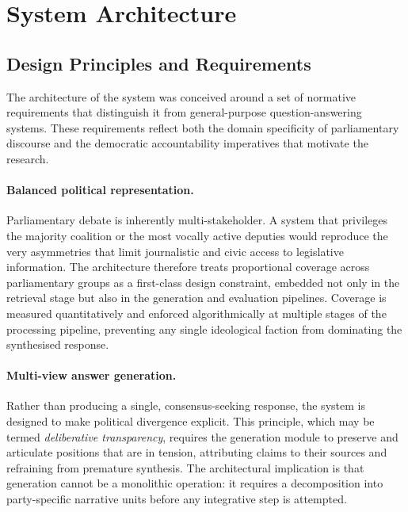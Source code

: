 
\section{System Architecture}

\subsection{Design Principles and Requirements}
\label{sec:design-principles}

The architecture of the system was conceived around a set of normative requirements that
distinguish it from general-purpose question-answering systems. These requirements reflect
both the domain specificity of parliamentary discourse and the democratic accountability
imperatives that motivate the research.

\paragraph{Balanced political representation.}
Parliamentary debate is inherently multi-stakeholder. A system that privileges the majority
coalition or the most vocally active deputies would reproduce the very asymmetries that
limit journalistic and civic access to legislative information. The architecture therefore
treats proportional coverage across parliamentary groups as a first-class design
constraint, embedded not only in the retrieval stage but also in the generation and
evaluation pipelines. Coverage is measured quantitatively and enforced algorithmically at
multiple stages of the processing pipeline, preventing any single ideological faction from
dominating the synthesised response.

\paragraph{Multi-view answer generation.}
Rather than producing a single, consensus-seeking response, the system is designed to make
political divergence explicit. This principle, which may be termed \textit{deliberative
transparency}, requires the generation module to preserve and articulate positions that are
in tension, attributing claims to their sources and refraining from premature synthesis.
The architectural implication is that generation cannot be a monolithic operation: it
requires a decomposition into party-specific narrative units before any integrative step is
attempted.

